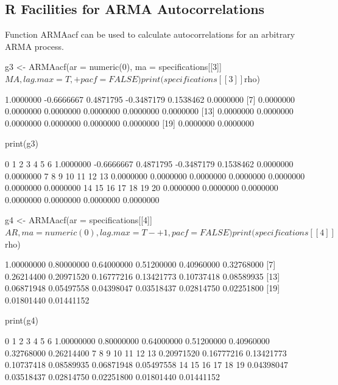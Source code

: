 \documentclass[a4paper]{article}
\begin{document}
\subsection{R Facilities for ARMA Autocorrelations}
Function ARMAacf can be used to calculate autocorrelations for an arbitrary ARMA process.
\begin{Schunk}
\begin{Sinput}
 g3 <- ARMAacf(ar = numeric(0), ma = specifications[[3]]$MA, lag.max = T, 
+     pacf = FALSE)
 print(specifications[[3]]$rho)
\end{Sinput}
\begin{Soutput}
 [1]  1.0000000 -0.6666667  0.4871795 -0.3487179  0.1538462  0.0000000
 [7]  0.0000000  0.0000000  0.0000000  0.0000000  0.0000000  0.0000000
[13]  0.0000000  0.0000000  0.0000000  0.0000000  0.0000000  0.0000000
[19]  0.0000000  0.0000000
\end{Soutput}
\begin{Sinput}
 print(g3)
\end{Sinput}
\begin{Soutput}
         0          1          2          3          4          5          6 
 1.0000000 -0.6666667  0.4871795 -0.3487179  0.1538462  0.0000000  0.0000000 
         7          8          9         10         11         12         13 
 0.0000000  0.0000000  0.0000000  0.0000000  0.0000000  0.0000000  0.0000000 
        14         15         16         17         18         19         20 
 0.0000000  0.0000000  0.0000000  0.0000000  0.0000000  0.0000000  0.0000000 
\end{Soutput}
\begin{Sinput}
 g4 <- ARMAacf(ar = specifications[[4]]$AR, ma = numeric(0), lag.max = T - 
+     1, pacf = FALSE)
 print(specifications[[4]]$rho)
\end{Sinput}
\begin{Soutput}
 [1] 1.00000000 0.80000000 0.64000000 0.51200000 0.40960000 0.32768000
 [7] 0.26214400 0.20971520 0.16777216 0.13421773 0.10737418 0.08589935
[13] 0.06871948 0.05497558 0.04398047 0.03518437 0.02814750 0.02251800
[19] 0.01801440 0.01441152
\end{Soutput}
\begin{Sinput}
 print(g4)
\end{Sinput}
\begin{Soutput}
         0          1          2          3          4          5          6 
1.00000000 0.80000000 0.64000000 0.51200000 0.40960000 0.32768000 0.26214400 
         7          8          9         10         11         12         13 
0.20971520 0.16777216 0.13421773 0.10737418 0.08589935 0.06871948 0.05497558 
        14         15         16         17         18         19 
0.04398047 0.03518437 0.02814750 0.02251800 0.01801440 0.01441152 
\end{Soutput}
\end{Schunk}
\end{document}
